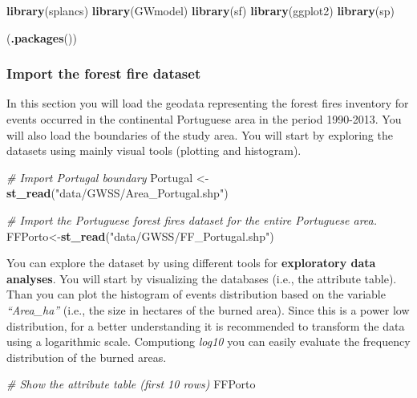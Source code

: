\documentclass[
]{article}
\newenvironment{Shaded}{\begin{snugshade}}{\end{snugshade}}
\newcommand{\CommentTok}[1]{\textcolor[rgb]{0.56,0.35,0.01}{\textit{#1}}}
\newcommand{\FunctionTok}[1]{\textcolor[rgb]{0.13,0.29,0.53}{\textbf{#1}}}
\newcommand{\NormalTok}[1]{#1}
\newcommand{\OtherTok}[1]{\textcolor[rgb]{0.56,0.35,0.01}{#1}}
\newcommand{\StringTok}[1]{\textcolor[rgb]{0.31,0.60,0.02}{#1}}
\begin{document}
\begin{Shaded}
\begin{Highlighting}[]
\FunctionTok{library}\NormalTok{(splancs)}
\FunctionTok{library}\NormalTok{(GWmodel)}
\FunctionTok{library}\NormalTok{(sf)}
\FunctionTok{library}\NormalTok{(ggplot2)}
\FunctionTok{library}\NormalTok{(sp)}

\NormalTok{(}\FunctionTok{.packages}\NormalTok{())}
\end{Highlighting}
\end{Shaded}

\subsubsection{Import the forest fire dataset}\label{import-the-forest-fire-dataset}

In this section you will load the geodata representing the forest fires inventory for events occurred in the continental Portuguese area in the period 1990-2013. You will also load the boundaries of the study area. You will start by exploring the datasets using mainly visual tools (plotting and histogram).

\begin{Shaded}
\begin{Highlighting}[]
\CommentTok{\# Import Portugal boundary }
\NormalTok{Portugal }\OtherTok{\textless{}{-}} \FunctionTok{st\_read}\NormalTok{(}\StringTok{"data/GWSS/Area\_Portugal.shp"}\NormalTok{)}

\CommentTok{\# Import the Portuguese forest fires dataset for the entire Portuguese area.}
\NormalTok{FFPorto}\OtherTok{\textless{}{-}}\FunctionTok{st\_read}\NormalTok{(}\StringTok{"data/GWSS/FF\_Portugal.shp"}\NormalTok{)}
\end{Highlighting}
\end{Shaded}

You can explore the dataset by using different tools for \textbf{exploratory data analyses}. You will start by visualizing the databases (i.e., the attribute table). Than you can plot the histogram of events distribution based on the variable \emph{``Area\_ha''} (i.e., the size in hectares of the burned area). Since this is a power low distribution, for a better understanding it is recommended to transform the data using a logarithmic scale. Computiong \emph{log10} you can easily evaluate the frequency distribution of the burned areas.

\begin{Shaded}
\begin{Highlighting}[]
\CommentTok{\# Show the attribute table (first 10 rows) }
\NormalTok{FFPorto }
\end{Highlighting}
\end{Shaded}
\end{document}
